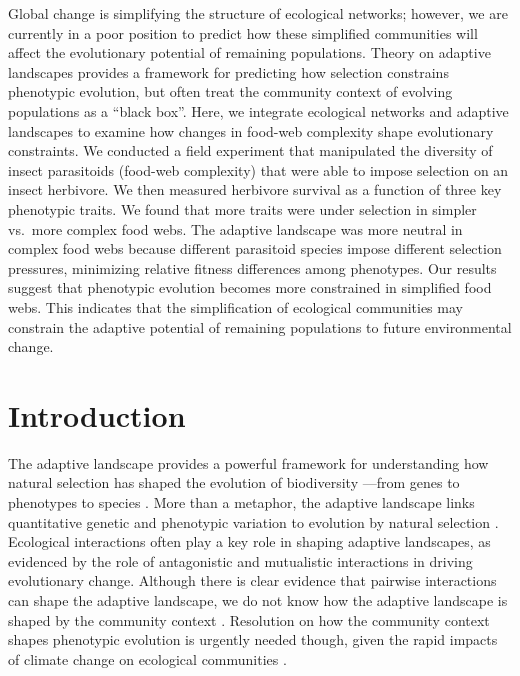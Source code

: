 \documentclass[11pt,]{article}
\begin{document}
Global change is simplifying the structure of ecological networks;
however, we are currently in a poor position to predict how these
simplified communities will affect the evolutionary potential of
remaining populations. Theory on adaptive landscapes provides a
framework for predicting how selection constrains phenotypic evolution,
but often treat the community context of evolving populations as a
``black box''. Here, we integrate ecological networks and adaptive
landscapes to examine how changes in food-web complexity shape
evolutionary constraints. We conducted a field experiment that
manipulated the diversity of insect parasitoids (food-web complexity)
that were able to impose selection on an insect herbivore. We then
measured herbivore survival as a function of three key phenotypic
traits. We found that more traits were under selection in simpler
vs.~more complex food webs. The adaptive landscape was more neutral in
complex food webs because different parasitoid species impose different
selection pressures, minimizing relative fitness differences among
phenotypes. Our results suggest that phenotypic evolution becomes more
constrained in simplified food webs. This indicates that the
simplification of ecological communities may constrain the adaptive
potential of remaining populations to future environmental change.

\newpage

\section{Introduction}\label{introduction}

The adaptive landscape provides a powerful framework for understanding
how natural selection has shaped the evolution of biodiversity ---from
genes to phenotypes to species
\citep{Wright1931, Simpson1944, Arnold2001}. More than a metaphor, the
adaptive landscape links quantitative genetic and phenotypic variation
to evolution by natural selection
\citep{Lande1979, Arnold1984applications, Arnold1984theory}. Ecological
interactions often play a key role in shaping adaptive landscapes, as
evidenced by the role of antagonistic \citep{Schluter2000, Abrams2000}
and mutualistic \citep{Bronstein2006} interactions in driving
evolutionary change. Although there is clear evidence that pairwise
interactions can shape the adaptive landscape, we do not know how the
adaptive landscape is shaped by the community context
\citep{McPeek2017, terHorst2018}. Resolution on how the community
context shapes phenotypic evolution is urgently needed though, given the
rapid impacts of climate change on ecological communities
\citep{Scheffers2016}.
\end{document}
